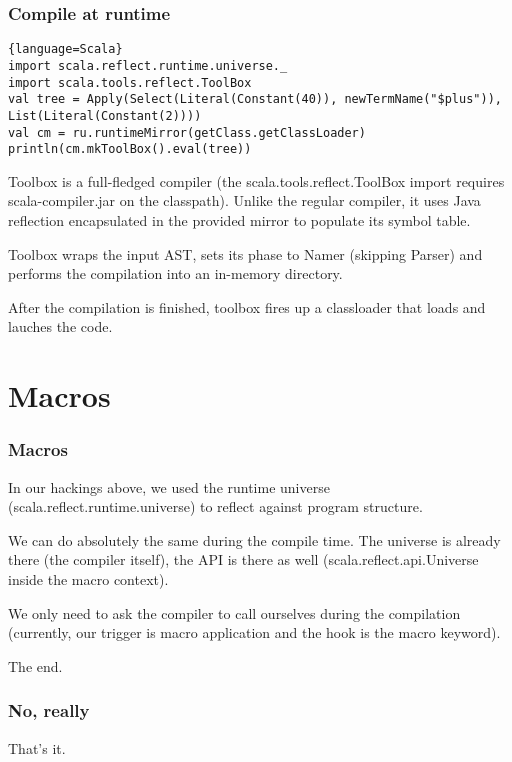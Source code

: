 \documentclass[hyperref={bookmarks=false}]{beamer}
\begin{document}
\begin{frame}[fragile]
\frametitle{Compile at runtime}

\begin{lstlisting}{language=Scala}
import scala.reflect.runtime.universe._
import scala.tools.reflect.ToolBox
val tree = Apply(Select(Literal(Constant(40)), newTermName("$plus")), List(Literal(Constant(2))))
val cm = ru.runtimeMirror(getClass.getClassLoader)
println(cm.mkToolBox().eval(tree))
\end{lstlisting}

Toolbox is a full-fledged compiler (the scala.tools.reflect.ToolBox import requires scala-compiler.jar on the classpath). Unlike the regular compiler, it uses Java reflection encapsulated in the provided mirror to populate its symbol table.

Toolbox wraps the input AST, sets its phase to Namer (skipping Parser) and performs the compilation into an in-memory directory.

After the compilation is finished, toolbox fires up a classloader that loads and lauches the code.

\end{frame}

\section{Macros}

\begin{frame}[fragile]
\frametitle{Macros}

In our hackings above, we used the runtime universe (scala.reflect.runtime.universe) to reflect against program structure.

We can do absolutely the same during the compile time.
The universe is already there (the compiler itself), the API is there as well
(scala.reflect.api.Universe inside the macro context).

We only need to ask the compiler to call ourselves during the compilation
(currently, our trigger is macro application and the hook is the macro keyword).

The end.

\end{frame}

\begin{frame}[fragile]
\frametitle{No, really}

That's it.

\end{frame}
\end{document}

